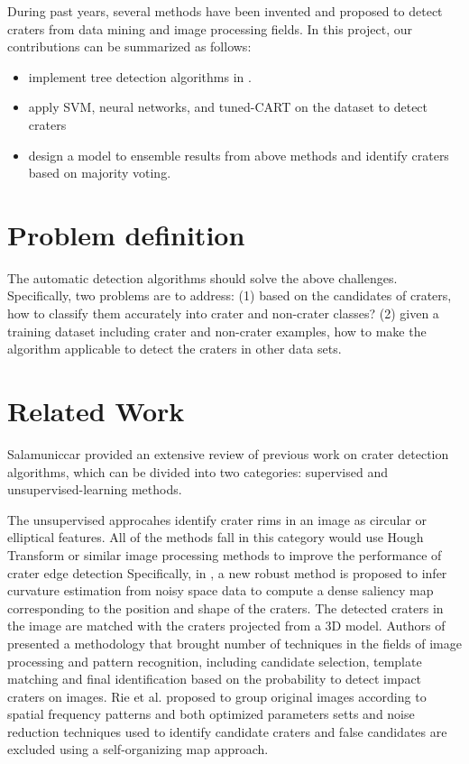 \documentclass[conference]{IEEEtran}
\begin{document}
During past years, several methods have been invented and proposed to detect craters from data mining and image processing fields. In this project, our contributions can be summarized as follows:
    \begin{itemize}
    \item implement tree detection algorithms in \cite{ding2011subkilometer}.
    \item apply SVM, neural networks, and tuned-CART on the dataset to detect craters
    \item design a model to ensemble results from above methods and identify craters based on majority voting.
    \end{itemize}

\section{Problem definition}
The automatic detection algorithms should solve the above challenges. Specifically, two problems are to address: (1) based on the candidates of craters, how to classify them accurately into crater and non-crater classes? (2) given a training dataset including crater and non-crater examples, how to make the algorithm applicable to detect the craters in other data sets.

\section{Related Work}

Salamuniccar\cite{salamuniccar2008open} provided an extensive review of previous work on crater detection algorithms, which can be divided into two categories: supervised and unsupervised-learning methods. 

The unsupervised approcahes identify crater rims in an image as circular or elliptical features\cite{bandeira2007impact,cheng2003optical,honda2002mining,leroy2001crater,galloway2014image}. All of the methods fall in this category would use Hough Transform or similar image processing methods to improve the performance of crater edge detection Specifically, in \cite{leroy2001crater}, a new robust method is proposed to infer curvature estimation from noisy space data  to compute a dense saliency map corresponding to the position and shape of the craters. The detected craters in the image are matched with the craters projected from a 3D model. Authors of \cite{bandeira2007impact} presented a methodology that brought number of techniques in the fields of image processing and pattern recognition, including candidate selection, template matching and final identification based on the probability to detect impact craters on images. Rie et al.\cite{honda2002mining} proposed to group original images according to spatial frequency patterns and both optimized parameters setts and noise reduction techniques used to identify candidate craters and false candidates are excluded using a self-organizing map approach.
\end{document}
